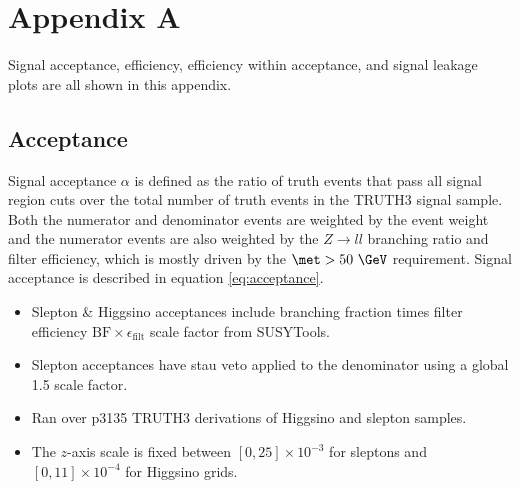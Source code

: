 \chapter{Appendix A}
\label{ch:apndx:a}
Signal acceptance, efficiency, efficiency within acceptance, and signal leakage plots are all shown in this appendix.

\section{Acceptance}
Signal acceptance $\alpha$ is defined as the ratio of truth events that pass all signal region cuts over the total number of truth events in the TRUTH3 signal sample.  Both the numerator and denominator events are weighted by the event weight and the numerator events are also weighted by the $Z\rightarrow ll$ branching ratio and filter efficiency, which is mostly driven by the $\met > 50~\GeV$ requirement.  Signal acceptance is described in equation \ref{eq:acceptance}.\\


\begin{itemize}
\item Slepton \& Higgsino acceptances include branching fraction times filter efficiency $\text{BF} \times \epsilon_\text{filt}$ scale factor from SUSYTools.
\item Slepton acceptances have stau veto applied to the denominator using a global 1.5 scale factor.
\item Ran over p3135 TRUTH3 derivations of Higgsino and slepton samples.
\item The $z$-axis scale is fixed between $[0, 25] \times 10^{-3}$ for sleptons and $[0, 11]\times 10^{-4}$ for Higgsino grids.
\end{itemize}



